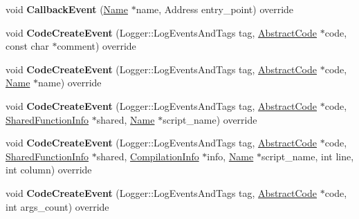 \begin{DoxyCompactItemize}
\item 
void {\bfseries Callback\+Event} (\hyperlink{classv8_1_1internal_1_1_name}{Name} $\ast$name, Address entry\+\_\+point) override\hypertarget{classv8_1_1internal_1_1_cpu_profiler_a05215da09f91d74619576b322e950797}{}\label{classv8_1_1internal_1_1_cpu_profiler_a05215da09f91d74619576b322e950797}

\item 
void {\bfseries Code\+Create\+Event} (Logger\+::\+Log\+Events\+And\+Tags tag, \hyperlink{classv8_1_1internal_1_1_abstract_code}{Abstract\+Code} $\ast$code, const char $\ast$comment) override\hypertarget{classv8_1_1internal_1_1_cpu_profiler_ae57c9437b7beb9fe3370f6ee1d6bef35}{}\label{classv8_1_1internal_1_1_cpu_profiler_ae57c9437b7beb9fe3370f6ee1d6bef35}

\item 
void {\bfseries Code\+Create\+Event} (Logger\+::\+Log\+Events\+And\+Tags tag, \hyperlink{classv8_1_1internal_1_1_abstract_code}{Abstract\+Code} $\ast$code, \hyperlink{classv8_1_1internal_1_1_name}{Name} $\ast$name) override\hypertarget{classv8_1_1internal_1_1_cpu_profiler_a2ea6ec3f1f40d941cd4cc9ba0e27eb5e}{}\label{classv8_1_1internal_1_1_cpu_profiler_a2ea6ec3f1f40d941cd4cc9ba0e27eb5e}

\item 
void {\bfseries Code\+Create\+Event} (Logger\+::\+Log\+Events\+And\+Tags tag, \hyperlink{classv8_1_1internal_1_1_abstract_code}{Abstract\+Code} $\ast$code, \hyperlink{classv8_1_1internal_1_1_shared_function_info}{Shared\+Function\+Info} $\ast$shared, \hyperlink{classv8_1_1internal_1_1_name}{Name} $\ast$script\+\_\+name) override\hypertarget{classv8_1_1internal_1_1_cpu_profiler_a96d6e69bdf783674740b095b59aa5eec}{}\label{classv8_1_1internal_1_1_cpu_profiler_a96d6e69bdf783674740b095b59aa5eec}

\item 
void {\bfseries Code\+Create\+Event} (Logger\+::\+Log\+Events\+And\+Tags tag, \hyperlink{classv8_1_1internal_1_1_abstract_code}{Abstract\+Code} $\ast$code, \hyperlink{classv8_1_1internal_1_1_shared_function_info}{Shared\+Function\+Info} $\ast$shared, \hyperlink{classv8_1_1internal_1_1_compilation_info}{Compilation\+Info} $\ast$info, \hyperlink{classv8_1_1internal_1_1_name}{Name} $\ast$script\+\_\+name, int line, int column) override\hypertarget{classv8_1_1internal_1_1_cpu_profiler_ab60d3eb85fa14b37622a1aeb4639a33b}{}\label{classv8_1_1internal_1_1_cpu_profiler_ab60d3eb85fa14b37622a1aeb4639a33b}

\item 
void {\bfseries Code\+Create\+Event} (Logger\+::\+Log\+Events\+And\+Tags tag, \hyperlink{classv8_1_1internal_1_1_abstract_code}{Abstract\+Code} $\ast$code, int args\+\_\+count) override\hypertarget{classv8_1_1internal_1_1_cpu_profiler_a3a8577c88a0fb37294e05179ba1f0304}{}\label{classv8_1_1internal_1_1_cpu_profiler_a3a8577c88a0fb37294e05179ba1f0304}


\end{DoxyCompactItemize}
